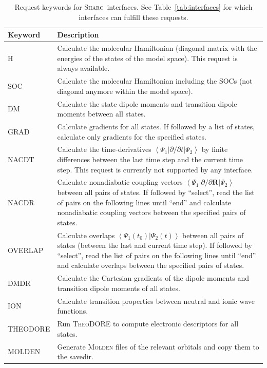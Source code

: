 \documentclass[a4paper,10pt,DIV=15,openany]{scrbook}
\newcommand{\sharc}{\textsc{Sharc}}
\begin{document}
\begin{table}
  \centering
  \caption[Request keywords for \sharc\ interfaces.]{Request keywords for \sharc\ interfaces. See Table~\ref{tab:interfaces} for which interfaces can fulfill these requests.}
  \label{tab:int_req}
  \begin{tabular}{>{\ttfamily}lp{13cm}}
  \hline
  Keyword       &Description\\
  \hline
  H               &Calculate the molecular Hamiltonian (diagonal matrix with the energies of the states of the model space). This request is always available.\\
  SOC             &Calculate the molecular Hamiltonian including the SOCs (not diagonal anymore within the model space).\\
  DM              &Calculate the state dipole moments and transition dipole moments between all states.\\
  GRAD            &Calculate gradients for all states. If followed by a list of states, calculate only gradients for the specified states.\\
  NACDT           &Calculate the time-derivatives $\left\langle\Psi_1|\partial/\partial t|\Psi_2\right\rangle$ by finite differences between the last time step and the current time step. This request is currently not supported by any interface.\\
  NACDR           &Calculate nonadiabatic coupling vectors $\left\langle\Psi_1|\partial/\partial \mathbf{R}|\Psi_2\right\rangle$ between all pairs of states. If followed by ``select'', read the list of pairs on the following lines until ``end'' and calculate nonadiabatic coupling vectors between the specified pairs of states.\\
  OVERLAP         &Calculate overlaps $\left\langle\Psi_1(t_0)|\Psi_2(t)\right\rangle$ between all pairs of states (between the last and current time step). If followed by ``select'', read the list of pairs on the following lines until ``end'' and calculate overlaps between the specified pairs of states.\\
  DMDR            &Calculate the Cartesian gradients of the dipole moments and transition dipole moments of all states.\\
  ION             &Calculate transition properties between neutral and ionic wave functions.\\

  THEODORE        &Run \textsc{TheoDORE} to compute electronic descriptors for all states.\\
  MOLDEN          &Generate \textsc{Molden} files of the relevant orbitals and copy them to the savedir.\\
  \hline
  \end{tabular}
\end{table}
\end{document}
